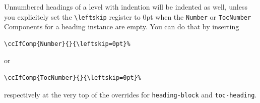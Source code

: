 Unnumbered headings of a level with indention will be indented as
well, unless you explicitely set the \lstinline{\leftskip} register to
0pt when the \lstinline{Number} or \lstinline{TocNumber} Components
for a heading instance are empty.  You can do that by inserting
\begin{lstlisting}
\ccIfComp{Number}{}{\leftskip=0pt}%
\end{lstlisting}
or
\begin{lstlisting}
\ccIfComp{TocNumber}{}{\leftskip=0pt}%
\end{lstlisting}
respectively at the very top of the overrides for
\lstinline{heading-block} and \lstinline{toc-heading}.


